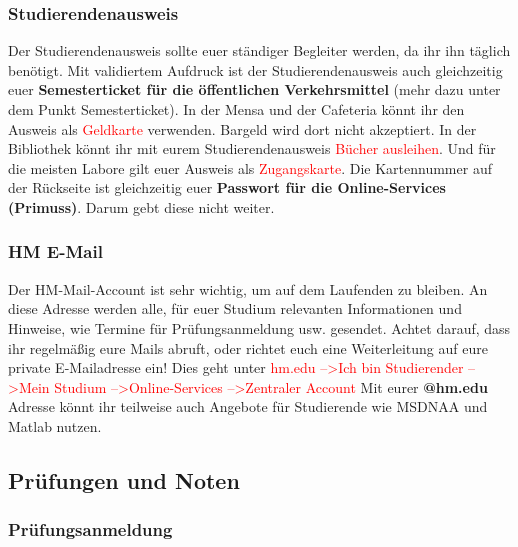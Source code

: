 \subsubsection{Studierendenausweis}

Der Studierendenausweis sollte euer ständiger Begleiter werden, da ihr ihn täglich benötigt. Mit validiertem Aufdruck ist der Studierendenausweis auch gleichzeitig euer \textbf{Semesterticket für die öffentlichen Verkehrsmittel} (mehr dazu unter dem Punkt \glqq Semesterticket\grqq{}). In der Mensa und der Cafeteria könnt ihr den Ausweis als \textcolor{red}{Geldkarte} verwenden. Bargeld wird dort nicht akzeptiert. In der Bibliothek könnt ihr mit eurem Studierendenausweis \textcolor{red}{Bücher ausleihen}. Und für die meisten Labore gilt euer Ausweis als \textcolor{red}{Zugangskarte}. Die Kartennummer auf der Rückseite ist gleichzeitig euer \textbf{Passwort für die Online-Services (Primuss)}. Darum gebt diese nicht weiter.

\subsubsection{HM E-Mail}

Der HM-Mail-Account ist sehr wichtig, um auf dem Laufenden zu bleiben. An diese Adresse werden alle, für euer Studium relevanten Informationen und Hinweise, wie Termine für Prüfungsanmeldung usw. gesendet. Achtet darauf, dass ihr regelmäßig eure Mails abruft, oder richtet euch eine Weiterleitung auf eure private E-Mailadresse ein!\doublebreak
Dies geht unter \textcolor{red}{hm.edu --\textgreater Ich bin Studierender --\textgreater Mein Studium --\textgreater Online-Services --\textgreater Zentraler Account}\doublebreak
Mit eurer  \textbf{@hm.edu}  Adresse könnt ihr teilweise auch Angebote für Studierende wie MSDNAA und Matlab nutzen.

\subsection{Prüfungen und Noten}
\subsubsection{Prüfungsanmeldung}

